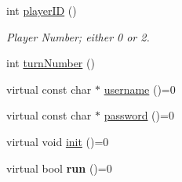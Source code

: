 \begin{CompactItemize}
int \hyperlink{classBaseAI_16aab1036653c8f8fb5370cf2f6a3e10}{playerID} ()
\begin{CompactList}\small\item\em Player Number; either 0 or 2. \item\end{CompactList}\item 
int \hyperlink{classBaseAI_19ade7391bfe101884a35f48fb840199}{turnNumber} ()
\item 
virtual const char $\ast$ \hyperlink{classBaseAI_ef082fbf306fec04515ed5ed3b1ba582}{username} ()=0
\item 
virtual const char $\ast$ \hyperlink{classBaseAI_9251e20447917cda64ad1487b903456f}{password} ()=0
\item 
virtual void \hyperlink{classBaseAI_90ce8becd6f2e32c2cc32d41145e88df}{init} ()=0
\item 
\hypertarget{classBaseAI_d60148e7e9e450ce47432b07b4db1ed6}{
virtual bool \textbf{run} ()=0}
\label{classBaseAI_d60148e7e9e450ce47432b07b4db1ed6}


\end{CompactItemize}
